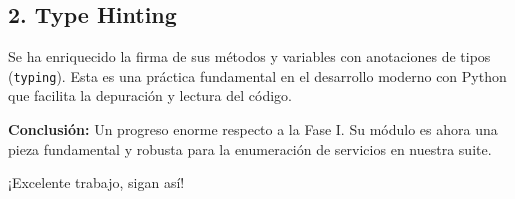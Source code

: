 \documentclass[12pt,a4paper]{article}
\begin{document}
\subsection*{2. Type Hinting}
Se ha enriquecido la firma de sus métodos y variables con anotaciones de tipos (\texttt{typing}). Esta es una práctica fundamental en el desarrollo moderno con Python que facilita la depuración y lectura del código.

\vspace{1cm}
\noindent \textbf{Conclusión:} Un progreso enorme respecto a la Fase I. Su módulo es ahora una pieza fundamental y robusta para la enumeración de servicios en nuestra suite.

\vspace{0.5cm}
\noindent ¡Excelente trabajo, sigan así!
\end{document}
